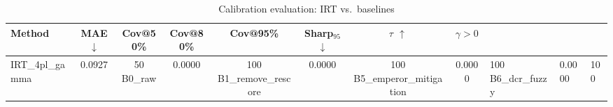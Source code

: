 \begin{table}[t]
\centering
\small
\caption{Calibration evaluation: IRT vs.\ baselines}
\label{tab:calibration-eval}
\begin{tabular}{lccccccc}
\toprule
Method & MAE $\downarrow$ & Cov@50\% & Cov@80\% & Cov@95\% & Sharp$_{95}$ $\downarrow$ & $\tau$ $\uparrow$ & $\gamma > 0$ \\
\midrule
IRT\_4pl\_gamma & 0.0927 & 50%
B0\_raw & 0.0000 & 100%
B1\_remove\_rescore & 0.0000 & 100%
B5\_emperor\_mitigation & 0.0000 & 100%
B6\_dcr\_fuzzy & 0.0000 & 100%
\bottomrule
\end{tabular}
\end{table}